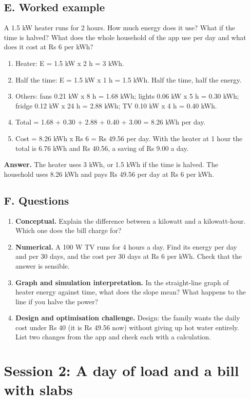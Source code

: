 \documentclass[11pt,a4paper]{article}
\begin{document}
\subsection*{E. Worked example}
A 1.5 kW heater runs for 2 hours. How much energy does it use? What if the time is halved? What does the whole household of the app use per day and what does it cost at Rs 6 per kWh?
\begin{enumerate}[nosep]
\item Heater: E = 1.5 kW x 2 h = 3 kWh.
\item Half the time: E = 1.5 kW x 1 h = 1.5 kWh. Half the time, half the energy.
\item Others: fans 0.21 kW x 8 h = 1.68 kWh; lights 0.06 kW x 5 h = 0.30 kWh; fridge 0.12 kW x 24 h = 2.88 kWh; TV 0.10 kW x 4 h = 0.40 kWh.
\item Total = 1.68 + 0.30 + 2.88 + 0.40 + 3.00 = 8.26 kWh per day.
\item Cost = 8.26 kWh x Rs 6 = Rs 49.56 per day. With the heater at 1 hour the total is 6.76 kWh and Rs 40.56, a saving of Rs 9.00 a day.
\end{enumerate}
\textbf{Answer.} The heater uses 3 kWh, or 1.5 kWh if the time is halved. The household uses 8.26 kWh and pays Rs 49.56 per day at Rs 6 per kWh.

\subsection*{F. Questions}
\begin{enumerate}[nosep]
\item \textbf{Conceptual.} Explain the difference between a kilowatt and a kilowatt-hour. Which one does the bill charge for?
\item \textbf{Numerical.} A 100 W TV runs for 4 hours a day. Find its energy per day and per 30 days, and the cost per 30 days at Rs 6 per kWh. Check that the answer is sensible.
\item \textbf{Graph and simulation interpretation.} In the straight-line graph of heater energy against time, what does the slope mean? What happens to the line if you halve the power?
\item \textbf{Design and optimisation challenge.} Design: the family wants the daily cost under Rs 40 (it is Rs 49.56 now) without giving up hot water entirely. List two changes from the app and check each with a calculation.
\end{enumerate}

\section{Session 2: A day of load and a bill with slabs}
\end{document}

